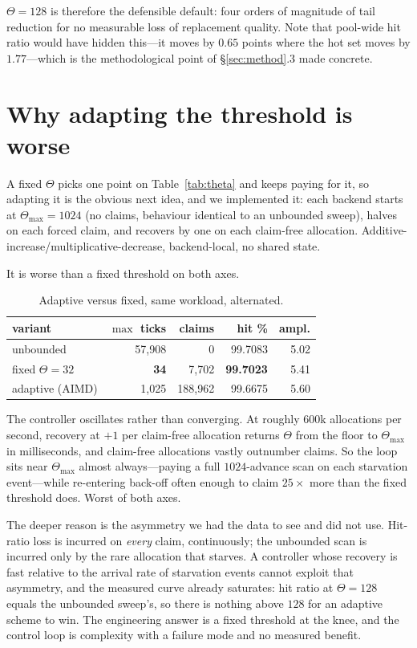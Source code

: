 \documentclass[sigconf,nonacm]{acmart}
\begin{document}
$\Theta=128$ is therefore the defensible default: four orders of magnitude of
tail reduction for no measurable loss of replacement quality. Note that
pool-wide hit ratio would have hidden this---it moves by $0.65$ points where
the hot set moves by $1.77$---which is the methodological point of
\S\ref{sec:method}.3 made concrete.

\section{Why adapting the threshold is worse}
\label{sec:adaptive}

A fixed $\Theta$ picks one point on Table~\ref{tab:theta} and keeps paying for
it, so adapting it is the obvious next idea, and we implemented it: each
backend starts at $\Theta_{\max}=1024$ (no claims, behaviour identical to an
unbounded sweep), halves on each forced claim, and recovers by one on each
claim-free allocation. Additive-increase/multiplicative-decrease, backend-local,
no shared state.

It is worse than a fixed threshold on both axes.

\begin{table}[h]
\centering
\caption{Adaptive versus fixed, same workload, alternated.}
\label{tab:adaptive}
\small
\begin{tabular}{lrrrr}
\toprule
variant & $\max$ ticks & claims & hit \% & ampl. \\
\midrule
unbounded      & 57{,}908 & 0        & 99.7083 & 5.02 \\
fixed $\Theta{=}32$ & \textbf{34} & 7{,}702 & \textbf{99.7023} & 5.41 \\
adaptive (AIMD)& 1{,}025  & 188{,}962 & 99.6675 & 5.60 \\
\bottomrule
\end{tabular}
\end{table}

The controller oscillates rather than converging. At roughly $600$k
allocations per second, recovery at $+1$ per claim-free allocation returns
$\Theta$ from the floor to $\Theta_{\max}$ in milliseconds, and claim-free
allocations vastly outnumber claims. So the loop sits near $\Theta_{\max}$
almost always---paying a full $1024$-advance scan on each starvation
event---while re-entering back-off often enough to claim $25\times$ more than
the fixed threshold does. Worst of both axes.

The deeper reason is the asymmetry we had the data to see and did not use.
Hit-ratio loss is incurred on \emph{every} claim, continuously; the unbounded
scan is incurred only by the rare allocation that starves. A controller whose
recovery is fast relative to the arrival rate of starvation events cannot
exploit that asymmetry, and the measured curve already saturates: hit ratio at
$\Theta=128$ equals the unbounded sweep's, so there is nothing above $128$ for
an adaptive scheme to win. The engineering answer is a fixed threshold at the
knee, and the control loop is complexity with a failure mode and no measured
benefit.
\end{document}
